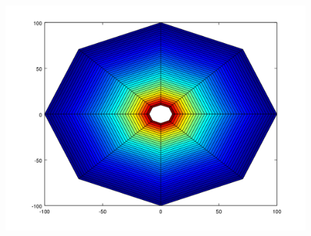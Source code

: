 \begin{figure}[H]
\begin{minipage}{0.30\textwidth}
  \centering
    \includegraphics[width=1\textwidth]{imgs/comp_angulos/comp_angs_temp4.png} 
  \caption{}
  \label{fig:comp_angs_temp4}
\end{minipage}
\end{figure}


